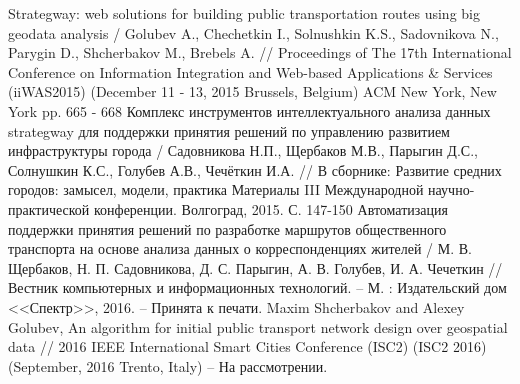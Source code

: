 \renewcommand{\bibname}{Публикации по теме диссертации}
\begin{thebibliography}{10}
     Strategway: web solutions for building public transportation routes using big geodata 
        analysis / Golubev A., Chechetkin I., Solnushkin K.S., Sadovnikova N., Parygin D., Shcherbakov M., 
        Brebels A. // Proceedings of The 17th International Conference on Information Integration and 
        Web-based Applications \& Services (iiWAS2015) (December 11 - 13, 2015 Brussels, Belgium) 
        ACM New York, New York pp. 665 - 668
     Комплекс инструментов интеллектуального анализа данных strategway для поддержки 
        принятия решений по управлению развитием инфраструктуры города / Садовникова Н.П., Щербаков М.В., 
        Парыгин Д.С., Солнушкин К.С., Голубев А.В., Чечёткин И.А. // В сборнике: Развитие средних 
        городов: замысел, модели, практика Материалы III Международной научно-практической конференции. 
        Волгоград, 2015. С. 147-150
     Автоматизация поддержки принятия решений по разработке маршрутов общественного 
        транспорта на основе анализа данных о корреспонденциях жителей / М. В. Щербаков, 
        Н. П. Садовникова, Д. С. Парыгин, А. В. Голубев, И. А. Чечеткин // Вестник компьютерных и 
        информационных технологий. -- М. : Издательский дом <<Спектр>>, 2016. -- Принята к печати.
     Maxim Shcherbakov and Alexey Golubev, An algorithm for initial public transport network 
        design over geospatial data // 2016 IEEE International Smart Cities Conference (ISC2) (ISC2 2016) 
        (September, 2016 Trento, Italy) -- На рассмотрении.
\end{thebibliography}